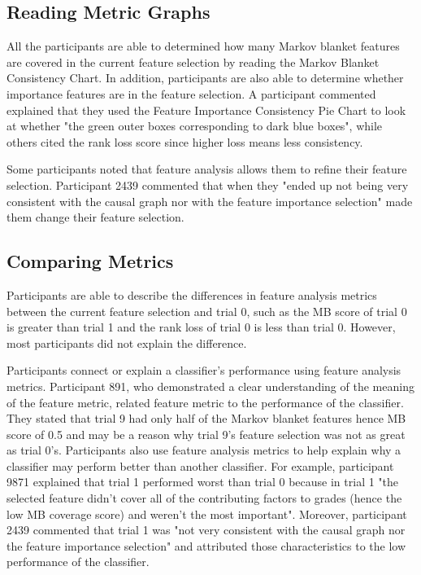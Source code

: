 \subsection{ Reading Metric Graphs }
All the participants are able to determined how many Markov blanket features are covered in the current feature selection by reading the Markov Blanket Consistency Chart. In addition, participants are also able to determine whether importance features are in the feature selection. A participant commented explained that they used the Feature Importance Consistency Pie Chart to look at whether "the green outer boxes corresponding to dark blue boxes", while others cited the rank loss score since higher loss means less consistency.

Some participants noted that feature analysis allows them to refine their feature selection. Participant 2439 commented that when they "ended up not being very consistent with the causal graph nor with the feature importance selection" made them change their feature selection.

\subsection { Comparing Metrics }
Participants are able to describe the differences in feature analysis metrics between the current feature selection and trial 0, such as the MB score of trial 0 is greater than trial 1 and the rank loss of trial 0 is less than trial 0. However, most participants did not explain the difference.

Participants connect or explain a classifier's performance using feature analysis metrics. Participant 891, who demonstrated a clear understanding of the meaning of the feature metric, related feature metric to the performance of the classifier. They stated that trial 9 had only half of the Markov blanket features hence MB score of 0.5 and may be a reason why trial 9’s feature selection was not as great as trial 0’s.
Participants also use feature analysis metrics to help explain why a classifier may perform better than another classifier. For example, participant 9871 explained that trial 1 performed worst than trial 0 because in trial 1 "the selected feature didn't cover all of the contributing factors to grades (hence the low MB coverage score) and weren't the most important". Moreover, participant 2439 commented that trial 1 was "not very consistent with the causal graph nor the feature importance selection" and attributed those characteristics to the low performance of the classifier.

